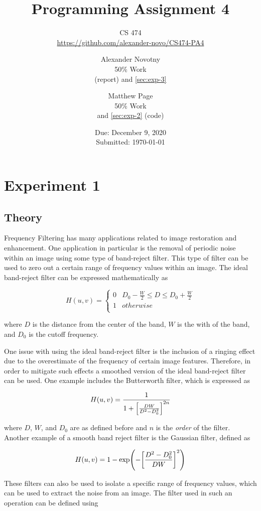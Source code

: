 \documentclass[headings=optiontoheadandtoc,listof=totoc,parskip=full]{scrartcl}
\title{Programming Assignment 4}
\subtitle{CS 474\\\url{https://github.com/alexander-novo/CS474-PA4}}
\author{Alexander Novotny\\50\% Work\\\Cref{sec:exp-2} (report) and \cref{sec:exp-3} \and Matthew Page\\50\% Work\\\Cref{sec:exp-1} and \cref{sec:exp-2} (code)}
\date{Due: December 9, 2020 \\ Submitted: \today}
\begin{document}
\maketitle
\tableofcontents
{}

\newpage
{}

\section{Experiment 1}
\label{sec:exp-1}

\subsection{Theory}

Frequency Filtering has many applications related to image restoration and enhancement. One application in particular is the removal of periodic noise within an image using some type of band-reject filter. This type of filter can be used to zero out a certain range of frequency values within an image. The ideal band-reject filter can be expressed mathematically as

\[
	H(u,v) = 	\begin{cases} 
      				0 & D_0-\frac{W}{2} \leq D \leq D_0+\frac{W}{2} \\
      				1 & otherwise \\
   				\end{cases}
\]

where $D$ is the distance from the center of the band, $W$ is the with of the band, and $D_0$ is the cutoff frequency.

One issue with using the ideal band-reject filter is the inclusion of a ringing effect due to the overestimate of the frequency of certain image features. Therefore, in order to mitigate such effects a smoothed version of the ideal band-reject filter can be used. One example includes the Butterworth filter, which is expressed as 

\[
	H(u,v) = \frac{1}{1+\qty[\frac{DW}{D^2-D_0^2}]^{2n}}
\]

where $D$, $W$, and $D_0$ are as defined before and $n$ is the \emph{order} of the filter. Another example of a smooth band reject filter is the Gaussian filter, defined as

\[
	H(u,v) = 1-\exp(-\qty[\frac{D^2-D_0^2}{DW}]^2)
\]

These filters can also be used to isolate a specific range of frequency values, which can be used to extract the noise from an image. The filter used in such an operation can be defined using
\end{document}
